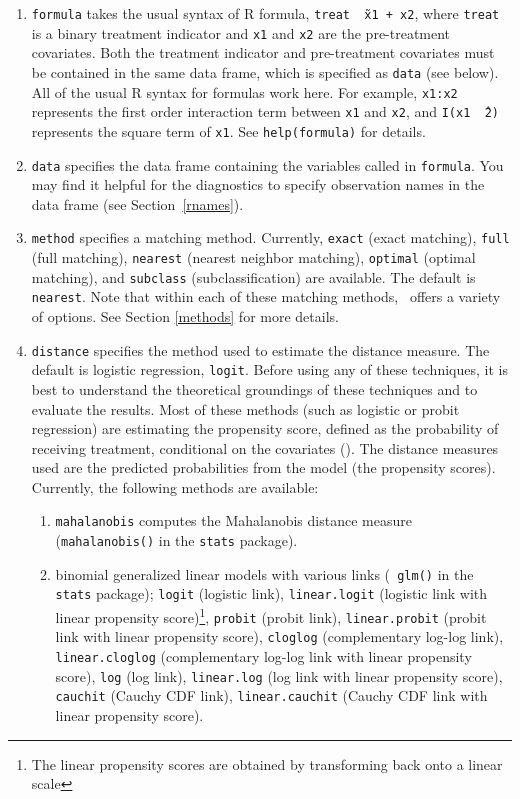 \begin{enumerate}
  
\item \texttt{formula} takes the usual syntax of R formula, {\tt treat
    \~\ x1 + x2}, where {\tt treat} is a binary treatment indicator
  and {\tt x1} and {\tt x2} are the pre-treatment covariates. Both the
  treatment indicator and pre-treatment covariates must be contained
  in the same data frame, which is specified as {\tt data} (see
  below).  All of the usual R syntax for formulas work here. For
  example, {\tt x1:x2} represents the first order interaction term
  between {\tt x1} and {\tt x2}, and {\tt I(x1 \^\ 2)} represents the
  square term of {\tt x1}. See {\tt help(formula)} for details.
  
\item \texttt{data} specifies the data frame containing the variables
  called in {\tt formula}.  You may find it helpful for the
  diagnostics to specify observation names in the data frame (see
  Section~\ref{rnames}).
  
\item \texttt{method} specifies a matching method. Currently,
  \texttt{exact} (exact matching), \texttt{full} (full matching),
  \texttt{nearest} (nearest neighbor matching), \texttt{optimal}
  (optimal matching), and \texttt{subclass} (subclassification) are
  available. The default is \texttt{nearest}. Note that within each of
  these matching methods, \MatchIt\ offers a variety of options.  See
  Section \ref{methods} for more details.
  
\item \texttt{distance} specifies the method used to estimate the
  distance measure. The default is logistic regression, {\tt logit}.
  Before using any of these techniques, it is best to understand the
  theoretical groundings of these techniques and to evaluate the
  results.  Most of these methods (such as logistic or probit
  regression) are estimating the propensity score, defined as the
  probability of receiving treatment, conditional on the covariates
  (\cite{RosRub83}).  The distance measures used are the predicted
  probabilities from the model (the propensity scores).  Currently,
  the following methods are available:
  \begin{enumerate}
  \item {\tt mahalanobis} computes the Mahalanobis distance measure
    ({\tt mahalanobis()} in the {\tt stats} package).
  \item binomial generalized linear models with various links ({\tt
      glm()} in the {\tt stats} package); \texttt{logit} (logistic
    link), {\tt linear.logit} (logistic link with linear propensity
    score)\footnote{The linear propensity scores are obtained by
      transforming back onto a linear scale}, \texttt{probit} (probit
    link), {\tt linear.probit} (probit link with linear propensity
    score), {\tt cloglog} (complementary log-log link), {\tt
      linear.cloglog} (complementary log-log link with linear
    propensity score), {\tt log} (log link), {\tt linear.log} (log
    link with linear propensity score), {\tt cauchit} (Cauchy CDF
    link), {\tt linear.cauchit} (Cauchy CDF link with linear
    propensity score).


\end{enumerate}
\end{enumerate}

